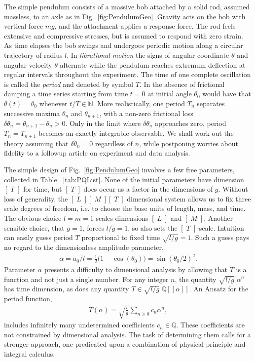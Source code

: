 \documentclass[nofootinbib,preprint]{revtex4-1}
\begin{document}
The simple pendulum consists of a massive bob attached by a solid rod, assumed 
massless, to an axle as in Fig.~\ref{fig:PendulumGeo}. Gravity acts on the bob with 
vertical force $mg$, and the attachment applies a response force. The rod feels 
extensive and compressive stresses, but is assumed to respond with zero strain.
As time elapses the bob swings and undergoes periodic motion 
along a circular trajectory of radius $l$. In \textit{librational motion}
the signs of angular coordinate $\theta$ and angular velocity $\dot{\theta}$ alternate 
while the pendulum reaches extremum deflection at regular intervals throughout the 
experiment. The time of one complete oscillation is called the \textit{period} and 
denoted by symbol $T$. In the absence of frictional damping a time series starting
from time $t=0$ at initial angle $\theta_0$ would have that $\theta(t)=\theta_0$ whenever 
$t/T\in \mathbb{N}$. More realistically, one period $T_n$ separates successive 
maxima $\theta_n$ and $\theta_{n+1}$, with a non-zero frictional loss $\delta\theta_n = 
\theta_{n+1}-\theta_n>0$. Only in the limit where $\delta\theta_n$ approaches zero, 
period $T_n=T_{n+1}$ becomes an exactly integrable observable. We shall work out the theory
assuming that $\delta\theta_n = 0$ regardless of $n$, while postponing worries about
fidelity to a followup article on experiment and data analysis.

The simple design of Fig.~\ref{fig:PendulumGeo} involves a few free 
parameters, collected in Table ~\ref{tab:PQList}. None of the initial parameters 
have dimension $[\;T\;]$ for time, but $[\;T\;]$ does occur as a factor in the 
dimensions of $g$. Without loss of generality, the $[\;L\;][\;M\;][\;T\;]$ dimensional 
system allows us to fix three scale degrees of freedom, i.e. to choose the base units
of length, mass, and time. The obvious choice $l=m=1$ scales dimensions $[\;L\;]$ and 
$[\;M\;]$. Another sensible choice, that $g=1$, forces $l/g=1$, 
so also sets the $[\;T\;]$-scale. Intuition can easily guess period $T$ proportional 
to fixed time $\sqrt{l/g}=1$. Such a guess pays no regard to the dimensionless 
amplitude parameter,
\begin{eqnarray}
\alpha = a_0/l = \frac{1}{2}\big( 1 - \cos(\theta_0) \big) =  \sin(\theta_0 / 2)^2. \nonumber
\end{eqnarray}
Parameter $\alpha$ presents a difficulty to dimensional analysis by allowing that $T$ 
is a function and not just a single number. For any integer $n$, the quantity 
$\sqrt{l/g}\;\alpha^n$ has time dimension, as does any quantity $T \in \sqrt{l/g}\;\mathbb{Q}[\![\alpha]\!]$. 
An Ansatz for the period function, 
\begin{eqnarray}
T(\alpha)=\sqrt{\frac{l}{g}}\sum_{n\ge 0}c_n \alpha^n, \nonumber
\end{eqnarray} 
includes infinitely many undetermined coefficients $c_n \in \mathbb{Q}$. These coefficients 
are not constrained by dimensional analysis. The task of determining them calls for a 
stronger approach, one predicated upon a combination of physical principle and
integral calculus.
\end{document}

